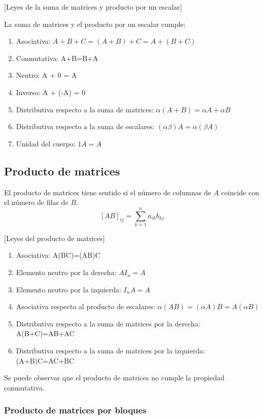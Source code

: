 [Leyes de la suma de matrices y producto por un escalar]

La suma de matrices y el producto por un escalar cumple:
\begin{enumerate}
	\item Asociativa: $A+B+C=(A+B)+C=A+(B+C)$
	\item Conmutativa: A+B=B+A
	\item Neutro: A + 0 = A
	\item Inverso: A + (-A) = 0
	\item Distributiva respecto a la suma de matrices: $\alpha (A+B) = \alpha A + \alpha B$
	\item Distributiva respecto a la suma de escalares: $(\alpha\beta)A = \alpha(\beta A)$
	\item Unidad del cuerpo: $1A = A$
\end{enumerate}


\subsection{Producto de matrices}

El producto de matrices tiene sentido si el número de columnas de $A$ coincide con el número de filas de $B$.
\[
[AB]_{ij} = \sum_{k=1}^{n}{a_{ik}b_{kj}}
\]

[Leyes del producto de matrices]
\begin{enumerate}
	\item Asociativa: A(BC)=(AB)C
	\item Elemento neutro por la derecha: $AI_n = A$
	\item Elemento neutro por la izquierda: $I_nA=A$
	\item Asociativa respecto al producto de escalares: $\alpha(AB)=(\alpha A)B=A(\alpha B)$
	\item Distributiva respecto a la suma de matrices por la derecha: A(B+C)=AB+AC
	\item Distributiva respecto a la suma de matrices por la izquierda: (A+B)C=AC+BC
\end{enumerate}


Se puede observar que el producto de matrices no cumple la propiedad conmutativa.

\subsubsection{Producto de matrices por bloques}

